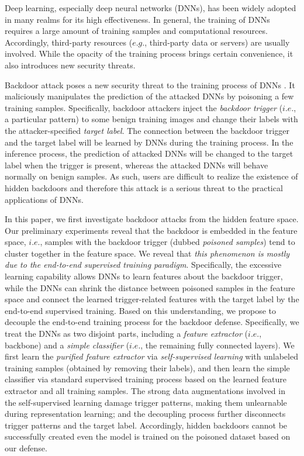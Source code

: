 Deep learning, especially deep neural networks (DNNs), has been widely adopted in many realms \citep{wang2020pillar,li2020short,wen20adaptive} for its high effectiveness. In general, the training of DNNs requires a large amount of training samples and computational resources. Accordingly, third-party resources ($e.g.$, third-party data or servers) are usually involved. While the opacity of the training process brings certain convenience, it also introduces new security threats.
 

Backdoor attack poses a new security threat to the training process of DNNs \citep{li2020backdoor}. It maliciously manipulates the prediction of the attacked DNNs by poisoning a few training samples. Specifically, backdoor attackers inject the \emph{backdoor trigger} ($i.e.$, a particular pattern) to some benign training images and change their labels with the attacker-specified \emph{target label}. The connection between the backdoor trigger and the target label will be learned by DNNs during the training process. In the inference process, the prediction of attacked DNNs will be changed to the target label when the trigger is present, whereas the attacked DNNs will behave normally on benign samples. As such, users are difficult to realize the existence of hidden backdoors and therefore this attack is a serious threat to the practical applications of DNNs.

In this paper, we first investigate backdoor attacks from the hidden feature space. Our preliminary experiments reveal that the backdoor is embedded in the feature space, $i.e.$, samples with the backdoor trigger (dubbed \emph{poisoned samples}) tend to cluster together in the feature space. We reveal that \emph{this phenomenon is mostly due to the end-to-end supervised training paradigm}. Specifically, the excessive learning capability allows DNNs to learn features about the backdoor trigger, while the DNNs can shrink the distance between poisoned samples in the feature space and connect the learned trigger-related features with the target label by the end-to-end supervised training. Based on this understanding, we propose to decouple the end-to-end training process for the backdoor defense. Specifically, we treat the DNNs as two disjoint parts, including a \emph{feature extractor} ($i.e.$, backbone) and a \emph{simple classifier} ($i.e.$, the remaining fully connected layers). We first learn the \emph{purified feature extractor} via \emph{self-supervised learning} \citep{kolesnikov2019revisiting,chen2020simple,jing2020self} with unlabeled training samples (obtained by removing their labels), and then learn the simple classifier via standard supervised training process based on the learned feature extractor and all training samples. The strong data augmentations involved in the self-supervised learning damage trigger patterns, making them unlearnable during representation learning; and the decoupling process further disconnects trigger patterns and the target label. Accordingly, hidden backdoors cannot be successfully created even the model is trained on the poisoned dataset based on our defense.

